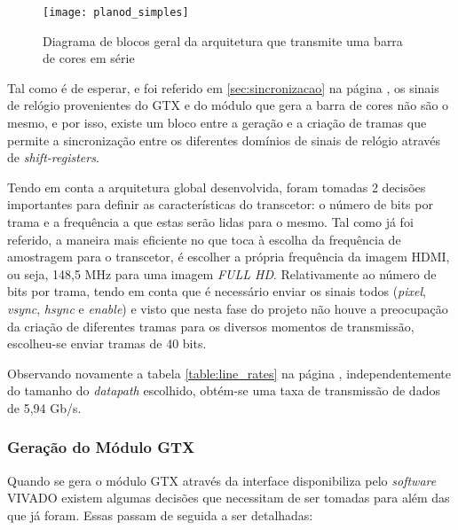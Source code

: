 \begin{figure}[h!]
	\begin{center}
		\leavevmode
		\texttt{[image: planod\_simples]}
		\captionsetup{width=1.0\linewidth}
		\caption[Diagrama de blocos geral da arquitetura que transmite uma barra de cores em série]{Diagrama de blocos geral da arquitetura que transmite uma barra de cores em série}
		\label{fig:planD_SIMPLES}
	\end{center}
\end{figure}

Tal como é de esperar, e foi referido em \ref{sec:sincronizacao} na página \pageref{sec:sincronizacao}, os sinais de relógio provenientes do GTX e do módulo que gera a barra de cores não são o mesmo, e por isso, existe um bloco entre a geração e a criação de tramas que permite a sincronização entre os diferentes domínios de sinais de relógio através de \textit{shift-registers}.

Tendo em conta a arquitetura global desenvolvida, foram tomadas 2 decisões importantes para definir as características do transcetor: o número de bits por trama e a frequência a que estas serão lidas para o mesmo. Tal como já foi referido, a maneira mais eficiente no que toca à escolha da frequência de amostragem para o transcetor, é escolher a própria frequência da imagem HDMI, ou seja, 148,5 MHz para uma imagem \textit{FULL HD}. Relativamente ao número de bits por trama, tendo em conta que é necessário enviar os sinais todos (\textit{pixel}, \textit{vsync}, \textit{hsync} e \textit{enable}) e visto que nesta fase do projeto não houve a preocupação da criação de diferentes tramas para os diversos momentos de transmissão, escolheu-se enviar tramas de 40 bits.

Observando novamente a tabela \ref{table:line_rates} na página \pageref{table:line_rates}, independentemente do tamanho do \textit{datapath} escolhido, obtém-se uma taxa de transmissão de dados de 5,94 Gb/s.

\subsubsection{Geração do Módulo GTX} \label{subsub:GTX_generate}

Quando se gera o módulo GTX através da interface disponibiliza pelo \textit{software} VIVADO existem algumas decisões que necessitam de ser tomadas para além das que já foram. Essas passam de seguida a ser detalhadas:

